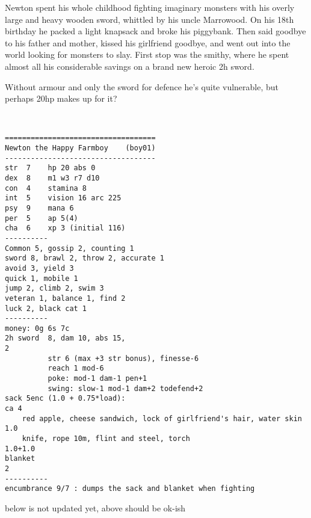 \clearpage
\begin{samepage}

\noindent Newton spent his whole childhood fighting imaginary monsters with his overly large and heavy wooden sword, whittled by his uncle Marrowood. On his 18th birthday he packed a light knapsack and broke his piggybank. Then said goodbye to his father and mother, kissed his girlfriend goodbye, and went out into the world looking for monsters to slay. First stop was the smithy, where he spent almost all his considerable savings on a brand new heroic 2h sword.

Without armour and only the sword for defence he's quite vulnerable, but perhaps 20hp makes up for it?

\

\small \begin{verbatim}
===================================
Newton the Happy Farmboy    (boy01)
-----------------------------------
str  7    hp 20 abs 0
dex  8    m1 w3 r7 d10
con  4    stamina 8
int  5    vision 16 arc 225
psy  9    mana 6
per  5    ap 5(4)
cha  6    xp 3 (initial 116)
----------
Common 5, gossip 2, counting 1
sword 8, brawl 2, throw 2, accurate 1
avoid 3, yield 3 
quick 1, mobile 1
jump 2, climb 2, swim 3
veteran 1, balance 1, find 2
luck 2, black cat 1
----------
money: 0g 6s 7c
2h sword  8, dam 10, abs 15,                                                   2
          str 6 (max +3 str bonus), finesse-6
          reach 1 mod-6
          poke: mod-1 dam-1 pen+1
          swing: slow-1 mod-1 dam+2 todefend+2
sack 5enc (1.0 + 0.75*load):                                                ca 4
    red apple, cheese sandwich, lock of girlfriend's hair, water skin    1.0
    knife, rope 10m, flint and steel, torch                          1.0+1.0
blanket                                                                        2
----------
encumbrance 9/7 : dumps the sack and blanket when fighting
\end{verbatim} \end{samepage} \normalsize











\clearpage
\TODO below is not updated yet, above should be ok-ish

\


%
%
%



